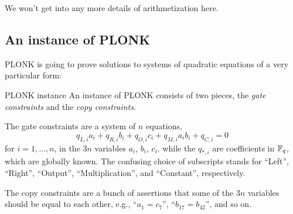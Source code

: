 We won't get into any more details of arithmetization here.

\subsection{An instance of PLONK}

PLONK is going to prove solutions to systems of quadratic equations of a
very particular form:

\begin{definition}{PLONK instance}{}
An instance of PLONK consists of two pieces, the \emph{gate constraints}
and the \emph{copy constraints}.

The \alert{gate constraints} are a system of $n$ equations,
\[q_{L,i}a_{i} + q_{R,i}b_{i} + q_{O,i}c_{i} + q_{M,i}a_{i}b_{i} + q_{C,i} = 0\]
for $i = 1,\ldots,n$, in the $3n$ variables $a_{i}$, $b_{i}$,
$c_{i}$. while the $q_{\ast ,i}$ are coefficients in
$\mathbb{F}_{q}$, which are globally known. The confusing choice of
subscripts stands for ``Left'', ``Right'', ``Output'',
``Multiplication'', and ``Constant'', respectively.

The \alert{copy constraints} are a bunch of assertions that some of the
$3n$ variables should be equal to each other, e.g.,
``$a_{1} = c_{7}$'', ``$b_{17} = b_{42}$'', and so on.
\end{definition}

